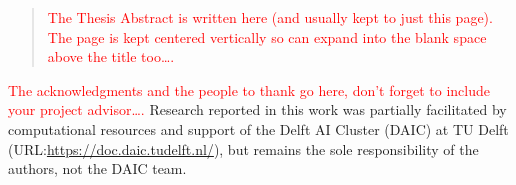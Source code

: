 \documentclass[
11pt, %
english, %
singlespacing, %
parskip, %
headsepline, %
dvipsnames]{misc/MastersDoctoralThesis} %
\theoremstyle{definition}
\newcommand\todo[1]{\textcolor{red}{#1}}
\begin{document}


\begin{abstract}
    \addchaptertocentry{\abstractname} %
    \todo{The Thesis Abstract is written here (and usually kept to just this page). The page is kept centered vertically so can expand into the blank space above the title too\ldots.}
\end{abstract}


\begin{acknowledgements}
    \addchaptertocentry{\acknowledgementname} %
    \todo{The acknowledgments and the people to thank go here, don't forget to include your project advisor\ldots.} Research reported in this work was partially facilitated by computational resources and support of the Delft AI Cluster (DAIC) at TU Delft (URL:\url{https://doc.daic.tudelft.nl/}), but remains the sole responsibility of the authors, not the DAIC team.
\end{acknowledgements}


\tableofcontents %

\listoffigures %

\listoftables %




\end{document}
